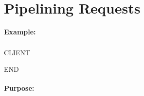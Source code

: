 
\newpage
\section{Pipelining Requests}
\label{case:PipeliningRequests}

\paragraph{Example:}
\subparagraph{}
\begin{usplisting}
    CLIENT

    END
\end{usplisting}


\paragraph{Purpose:}
\subparagraph{}
